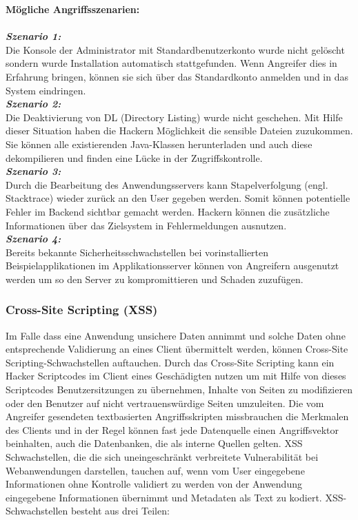 \textbf{Mögliche Angriffsszenarien:}\\
\\
\textbf{\textit{Szenario 1:}}\\

Die Konsole der Administrator mit Standardbenutzerkonto wurde nicht gelöscht sondern wurde Installation automatisch stattgefunden. Wenn Angreifer dies in Erfahrung bringen, können sie sich über das Standardkonto anmelden und in das System eindringen\cite{owasp13top10}.\\

\textbf{\textit{Szenario 2:}}\\

Die Deaktivierung von DL (Directory Listing) wurde nicht geschehen. Mit Hilfe dieser Situation haben die Hackern Möglichkeit die sensible Dateien zuzukommen. Sie können alle existierenden Java-Klassen herunterladen und auch diese dekompilieren und finden eine Lücke in der Zugriffskontrolle\cite{owasp13top10}.\\

\textbf{\textit{Szenario 3:}}\\

Durch die Bearbeitung des Anwendungsservers kann Stapelverfolgung (engl. Stacktrace) wieder zurück an den User gegeben werden. Somit können potentielle Fehler im Backend sichtbar gemacht werden. Hackern können die zusätzliche Informationen über das Zielsystem in Fehlermeldungen ausnutzen\cite{owasp13top10}.\\

\textbf{\textit{Szenario 4:}}\\

Bereits bekannte Sicherheitsschwachstellen bei vorinstallierten Beispielapplikationen im Applikationsserver können von Angreifern ausgenutzt werden um so den Server zu kompromittieren und Schaden zuzufügen\cite{owasp13top10}.\\

\subsubsection{Cross-Site Scripting (XSS)}

Im Falle dass eine Anwendung unsichere Daten annimmt und solche Daten ohne entsprechende Validierung an eines Client übermittelt werden, können Cross-Site Scripting-Schwachstellen auftauchen. Durch das Cross-Site Scripting kann ein Hacker Scriptcodes im Client eines Geschädigten nutzen um mit Hilfe von dieses Scriptcodes Benutzersitzungen zu übernehmen, Inhalte von Seiten zu modifizieren oder den Benutzer auf nicht vertrauenswürdige Seiten umzuleiten. Die vom Angreifer gesendeten textbasierten Angriffsskripten missbrauchen die Merkmalen des Clients und in der Regel können fast jede Datenquelle einen Angriffsvektor beinhalten, auch die Datenbanken, die als interne Quellen gelten. XSS Schwachstellen, die die sich uneingeschränkt verbreitete Vulnerabilität bei Webanwendungen darstellen, tauchen auf, wenn vom User eingegebene Informationen ohne Kontrolle validiert zu werden von der Anwendung eingegebene Informationen übernimmt und Metadaten als Text zu kodiert. XSS-Schwachstellen besteht aus drei Teilen\cite{owasp13top10}:\\

